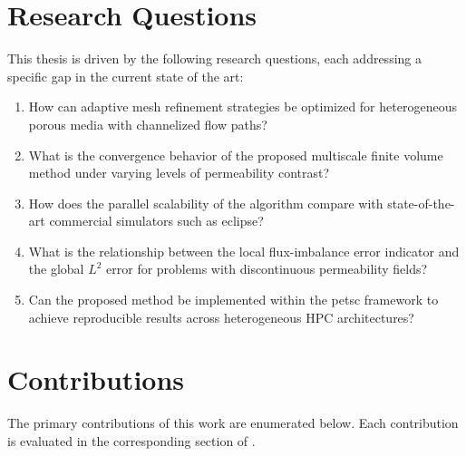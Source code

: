 \section{Research Questions}
\label{sec:introduction:questions}

This thesis is driven by the following research questions, each addressing a specific gap in the current state of the art:

\begin{enumerate}[label=\textbf{RQ\arabic*}, leftmargin=2.5em]
    \item \label{rq:amr} How can adaptive mesh refinement strategies be optimized for heterogeneous porous media with channelized flow paths?
    \item \label{rq:convergence} What is the convergence behavior of the proposed multiscale finite volume method under varying levels of permeability contrast?
    \item \label{rq:scalability} How does the parallel scalability of the algorithm compare with state-of-the-art commercial simulators such as \gls{eclipse}?
    \item \label{rq:error} What is the relationship between the local flux-imbalance error indicator and the global $L^2$ error for problems with discontinuous permeability fields?
    \item \label{rq:implementation} Can the proposed method be implemented within the \gls{petsc} framework to achieve reproducible results across heterogeneous HPC architectures?
\end{enumerate}


\section{Contributions}
\label{sec:introduction:contributions}

The primary contributions of this work are enumerated below. Each contribution is evaluated in the corresponding section of .

